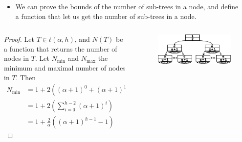 \documentclass{beamer}
\begin{document}
\begin{frame}
    \begin{columns}
        \begin{column}{\textlecolumn}
            \begin{block}{}
                \vspace{-0.5cm}
                \begin{itemize}
                    \item We can prove the bounds of the number of sub-trees in a node, and define a function that let us get the number of sub-trees in a node.
                \end{itemize}
            \end{block}
        \end{column}
        \begin{column}{\textricolumn}
        \end{column}
    \end{columns}
    \begin{columns}
        \begin{column}{0.5\textwidth}
            \begin{block}{}
                \begin{proof}\renewcommand{\qedsymbol}{}
                    Let \(T \in t\left(\alpha, h\right)\), and \(N(T)\) be a function that returns the number of nodes in \(T\).
                    Let \(N_{\text{min}}\) and \(N_{\text{max}}\) the minimum and maximal number of nodes in \(T\). Then
                    \[
                        \begin{aligned}
                            N_{\text{min}} &= 1 + 2\left(\left(\alpha + 1\right)^0 + \left(\alpha + 1\right)^1 + \cdots + \left(\alpha + 1\right)^{h-2} \right) \\
                            & = 1 + 2\left(\sum^{h - 2}_{i = 0} \left(\alpha + 1\right)^i \right) \\
                            & = 1 + \frac{2}{\alpha}\left(\left(\alpha + 1\right)^{h - 1} - 1\right)
                        \end{aligned}
                    \]
                \end{proof}
            \end{block}
        \end{column}
        \begin{column}{0.5\textwidth}
            \begin{figure}
                \includegraphics[width=0.95\linewidth,keepaspectratio]{resources/made/generic_min_btree.eps}

\end{figure}
\end{column}
\end{columns}
\end{frame}
\end{document}
